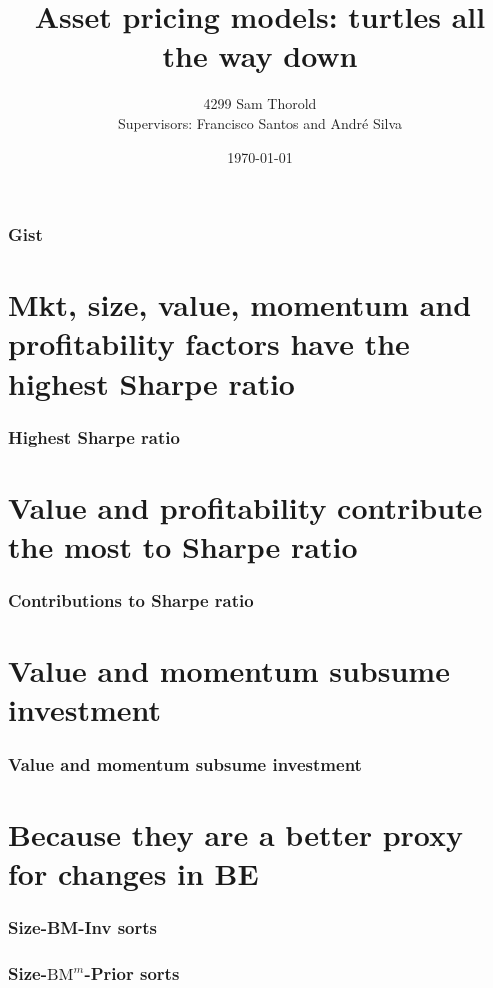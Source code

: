 \documentclass{beamer}
\title[Turtles]{Asset pricing models: turtles all the way down}
\author[Thorold]{4299 Sam Thorold\\
                 Supervisors: Francisco Santos and Andr\'e Silva}
\institute{NHH and NOVA}
\date[April 2018]{\today}
\begin{document}
\frame{\titlepage}

\begin{frame}
\frametitle{Gist}
\tableofcontents
\end{frame}

\section{Mkt, size, value, momentum and profitability factors have the highest
Sharpe ratio}
\begin{frame}
\frametitle{Highest Sharpe ratio}
\resizebox{\linewidth}{!}{}
\end{frame}

\section{Value and profitability contribute the most to Sharpe ratio}
\begin{frame}
\frametitle{Contributions to Sharpe ratio}
\begin{center}
\resizebox*{!}{\dimexpr\textheight-1.3cm\relax}{
    
    }
\end{center}
\end{frame}

\section{Value and momentum subsume investment}
\begin{frame}
\frametitle{Value and momentum subsume investment}
\begin{center}
\resizebox*{!}{\dimexpr\textheight-1.3cm\relax}{
    
    }
\end{center}
\end{frame}

\section{Because they are a better proxy for changes in BE}
\begin{frame}
\frametitle{Size-BM-Inv sorts}
\begin{center}
\resizebox*{!}{\dimexpr\textheight-1.3cm\relax}{
    
    }
\end{center}
\end{frame}
\begin{frame}
\frametitle{Size-$\text{BM}^m$-Prior sorts}
\begin{center}
\resizebox*{!}{\dimexpr\textheight-1.3cm\relax}{
    
    }
\end{center}
\end{frame}
\end{document}
